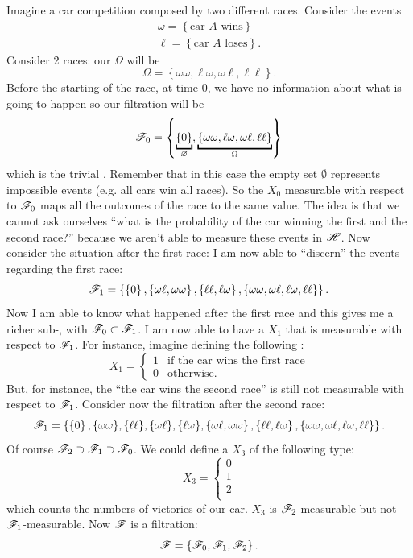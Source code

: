 \documentclass{report}
\begin{document}
\begin{example}
	Imagine a car competition composed by two different races. Consider the events
	\[\begin{array}{l}
		\omega=\left\{\text{car $A$ wins}\right\}\\
		\ell=\left\{\text{car $A$ loses}\right\}.
	\end{array}\]
	Consider 2 races: our $\Omega$ will be
	\[\Omega=\left\{\omega\omega,\ell\omega,\omega\ell,\ell\ell\right\}.\]
	Before the starting of the race, at time 0, we have no information about what is going to happen so our filtration will be
	\[\F_0=\left\{\underbracket{\left\{0\right\}}_{\emptyset},\underbracket{\left\{\omega\omega,\ell\omega,\omega\ell,\ell\ell\right\}}_{\Omega}\right\}\]
	which is the trivial \sa{}. Remember that in this case the empty set $\emptyset$ represents impossible events (e.g. all cars win all races). So the \rv{} $X_0$ measurable with respect to $\mathscr{F}_0$ maps all the outcomes of the race to the same value. The idea is that we cannot ask ourselves ``what is the probability of the car winning the first and the second race?'' because we aren't able to measure these events in $\mathscr{H}$. Now consider the situation after the first race: I am now able to ``discern'' the events regarding the first race:
	\[\mathscr{F}_1=\left\{\left\{0\right\},\left\{\omega\ell,\omega\omega\right\},\left\{\ell\ell,\ell\omega\right\},\left\{\omega\omega,\omega\ell,\ell\omega,\ell\ell\right\}\right\}.\]
	Now I am able to know what happened after the first race and this gives me a richer sub-\sa, with $\mathscr{F}_0\subset{\mathscr{F}_1}$. I am now able to have a \rv{} $X_1$ that is measurable with respect to $\mathscr{F}_1$. For instance, imagine defining the following \rv:
	\[X_1=\begin{cases}
		1 &\text{if the car wins the first race}\\
		0 &\text{otherwise}.
	\end{cases}\]
	But, for instance, the \rv{} ``the car wins the second race'' is still not measurable with respect to $\mathscr{F}_1$. Consider now the filtration after the second race:
	\[\mathscr{F}_1=\left\{\left\{0\right\},\{\omega\omega\},\{\ell\ell\},\{\omega\ell\},\{\ell\omega\},\left\{\omega\ell,\omega\omega\right\},\left\{\ell\ell,\ell\omega\right\},\left\{\omega\omega,\omega\ell,\ell\omega,\ell\ell\right\}\right\}.\]
	Of course $\mathscr{F}_2\supset\mathscr{F}_1\supset\mathscr{F}_0$. We could define a \rv{} $X_3$ of the following type:
	\[X_3=\begin{cases}
		0 \\
		1\\
		2\\
	\end{cases}\]
	which counts the numbers of victories of our car. $X_3$ is $\mathscr{F}_2$-measurable but not $\mathscr{F}_1$-measurable.
	Now $\mathscr{F}$ is a filtration:
	\[\mathscr{F}=\left\{\mathscr{F}_0,\mathscr{F}_1,\mathscr{F}_2\right\}.\]
\end{example}
\end{document}
